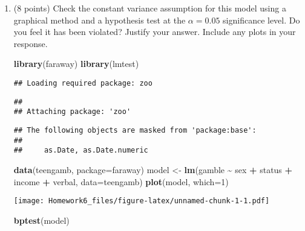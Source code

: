 \documentclass[
]{article}
\newenvironment{Shaded}{\begin{snugshade}}{\end{snugshade}}
\newcommand{\AttributeTok}[1]{\textcolor[rgb]{0.13,0.29,0.53}{#1}}
\newcommand{\DecValTok}[1]{\textcolor[rgb]{0.00,0.00,0.81}{#1}}
\newcommand{\FunctionTok}[1]{\textcolor[rgb]{0.13,0.29,0.53}{\textbf{#1}}}
\newcommand{\NormalTok}[1]{#1}
\newcommand{\OtherTok}[1]{\textcolor[rgb]{0.56,0.35,0.01}{#1}}
\newcommand{\SpecialCharTok}[1]{\textcolor[rgb]{0.81,0.36,0.00}{\textbf{#1}}}
\newcommand{\StringTok}[1]{\textcolor[rgb]{0.31,0.60,0.02}{#1}}
\begin{document}
\begin{enumerate}
\def\labelenumi{\arabic{enumi}.}
\item
  (8 points) Check the constant variance assumption for this model using
  a graphical method and a hypothesis test at the \(\alpha = 0.05\)
  significance level. Do you feel it has been violated? Justify your
  answer. Include any plots in your response.

\begin{Shaded}
\begin{Highlighting}[]
\FunctionTok{library}\NormalTok{(}\StringTok{\textquotesingle{}faraway\textquotesingle{}}\NormalTok{)}
\FunctionTok{library}\NormalTok{(}\StringTok{\textquotesingle{}lmtest\textquotesingle{}}\NormalTok{)}
\end{Highlighting}
\end{Shaded}

\begin{verbatim}
## Loading required package: zoo
\end{verbatim}

\begin{verbatim}
## 
## Attaching package: 'zoo'
\end{verbatim}

\begin{verbatim}
## The following objects are masked from 'package:base':
## 
##     as.Date, as.Date.numeric
\end{verbatim}

\begin{Shaded}
\begin{Highlighting}[]
\FunctionTok{data}\NormalTok{(teengamb, }\AttributeTok{package=}\StringTok{\textquotesingle{}faraway\textquotesingle{}}\NormalTok{)}
\NormalTok{model }\OtherTok{\textless{}{-}} \FunctionTok{lm}\NormalTok{(gamble }\SpecialCharTok{\textasciitilde{}}\NormalTok{ sex }\SpecialCharTok{+}\NormalTok{ status }\SpecialCharTok{+}\NormalTok{ income }\SpecialCharTok{+}\NormalTok{ verbal, }\AttributeTok{data=}\NormalTok{teengamb)}
\FunctionTok{plot}\NormalTok{(model, }\AttributeTok{which=}\DecValTok{1}\NormalTok{)}
\end{Highlighting}
\end{Shaded}

  \texttt{[image: Homework6\_files/figure-latex/unnamed-chunk-1-1.pdf]}

\begin{Shaded}
\begin{Highlighting}[]
\FunctionTok{bptest}\NormalTok{(model)}
\end{Highlighting}
\end{Shaded}


\end{enumerate}
\end{document}
